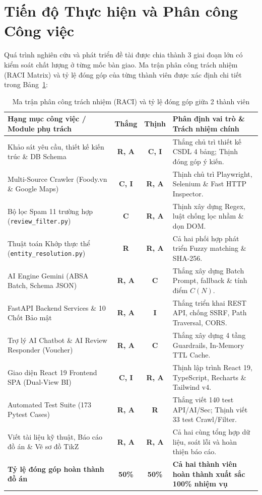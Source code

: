 \documentclass[12pt, a4paper]{article}
\begin{document}
\newpage
\section{Tiến độ Thực hiện và Phân công Công việc}

Quá trình nghiên cứu và phát triển đề tài được chia thành 3 giai đoạn lớn có kiểm soát chất lượng ở từng mốc bàn giao. Ma trận phân công trách nhiệm (RACI Matrix) và tỷ lệ đóng góp của từng thành viên được xác định chi tiết trong Bảng~\ref{tab:raci_matrix}:

\begin{table}[H]
\centering
\caption{Ma trận phân công trách nhiệm (RACI) và tỷ lệ đóng góp giữa 2 thành viên}
\label{tab:raci_matrix}
\vspace{0.15cm}
\footnotesize
\begin{tabularx}{\textwidth}{l c c X}
\toprule
\rowcolor{blue!8}
\textbf{Hạng mục công việc / Module phụ trách} & \textbf{Thắng} & \textbf{Thịnh} & \textbf{Phân định vai trò \& Trách nhiệm chính} \\
\midrule
Khảo sát yêu cầu, thiết kế kiến trúc \& DB Schema & \textbf{R, A} & \textbf{C, I} & Thắng chủ trì thiết kế CSDL 4 bảng; Thịnh đóng góp ý kiến. \\
Multi-Source Crawler (Foody.vn \& Google Maps) & \textbf{C, I} & \textbf{R, A} & Thịnh chủ trì Playwright, Selenium \& Fast HTTP Inspector. \\
Bộ lọc Spam 11 trường hợp (\texttt{review\_filter.py}) & \textbf{C} & \textbf{R, A} & Thịnh xây dựng Regex, luật chống lọc nhầm \& dọn DOM. \\
Thuật toán Khớp thực thể (\texttt{entity\_resolution.py}) & \textbf{R} & \textbf{R, A} & Cả hai phối hợp phát triển Fuzzy matching \& SHA-256. \\
AI Engine Gemini (ABSA Batch, Schema JSON) & \textbf{R, A} & \textbf{C} & Thắng xây dựng Batch Prompt, fallback \& tính điểm $C(N)$. \\
FastAPI Backend Services \& 10 Chốt Bảo mật & \textbf{R, A} & \textbf{I} & Thắng triển khai REST API, chống SSRF, Path Traversal, CORS. \\
Trợ lý AI Chatbot \& AI Review Responder (Voucher) & \textbf{R, A} & \textbf{C} & Thắng xây dựng 4 tầng Guardrails, In-Memory TTL Cache. \\
Giao diện React 19 Frontend SPA (Dual-View BI) & \textbf{C, I} & \textbf{R, A} & Thịnh lập trình React 19, TypeScript, Recharts \& Tailwind v4. \\
Automated Test Suite (173 Pytest Cases) & \textbf{R, A} & \textbf{R} & Thắng viết 140 test API/AI/Sec; Thịnh viết 33 test Crawl/Filter. \\
Viết tài liệu kỹ thuật, Báo cáo đồ án \& Vẽ sơ đồ TikZ & \textbf{R, A} & \textbf{R, A} & Cả hai cùng tổng hợp dữ liệu, soát lỗi và hoàn thiện báo cáo. \\
\midrule
\rowcolor{blue!8}
\textbf{Tỷ lệ đóng góp hoàn thành đồ án} & \textbf{50\%} & \textbf{50\%} & \textbf{Cả hai thành viên hoàn thành xuất sắc 100\% nhiệm vụ} \\
\bottomrule
\end{tabularx}
\end{table}
\end{document}
